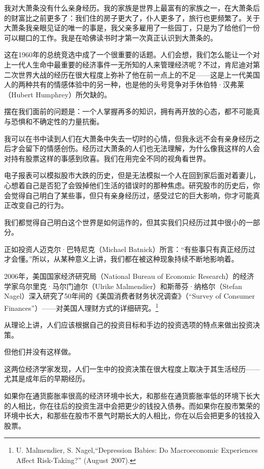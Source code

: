 {\kaishu

我对大萧条没有什么亲身经历。我的家族是世界上最富有的家族之一，在大萧条后的财富比之前更多了：我们住的房子更大了，仆人更多了，旅行也更频繁了。关于大萧条我亲眼见证的唯一的事是，我父亲多雇用了一些园丁，只是为了给他们一份可以糊口的工作。我是在哈佛读书时才第一次真正认识到大萧条的。

}

这在1960年的总统竞选中成了一个很重要的话题。人们会想，我们怎么能让一个对上一代人生命中最重要的经济事件一无所知的人来管理经济呢？不过，肯尼迪对第二次世界大战的经历在很大程度上弥补了他在前一点上的不足——这是上一代美国人的两种共有的情感体验中的另一种，也是他的头号竞争对手休伯特·汉弗莱（Hubert Humphrey）所欠缺的。

摆在我们面前的问题是：一个人掌握再多的知识，拥有再开放的心态，都不可能真与恐惧和不确定性的力量抗衡。

我可以在书中读到人们在大萧条中失去一切时的心情，但我永远不会有亲身经历之后才会留下的情感创伤。经历过大萧条的人们也无法理解，为什么像我这样的人会对持有股票这样的事感到欣喜。我们在用完全不同的视角看世界。

电子报表可以模拟股市大跌的历史，但是无法模拟一个人在回到家后面对着妻儿，心想着自己是否犯了会毁掉他们生活的错误时的那种焦虑。研究股市的历史后，你会觉得自己明白了某些事，但只有亲身经历过，感受过它的巨大影响，你才可能真正改变自己的行为。

我们都觉得自己明白这个世界是如何运作的，但其实我们只经历过其中很小的一部分。

正如投资人迈克尔·巴特尼克（Michael Batnick）所言：“有些事只有真正经历过才会懂。”所以，从某种意义上讲，我们都在被这种现象持续不断地影响着。

2006年，美国国家经济研究局（National Bureau of Economic Research）的经济学家乌尔里克·马尔门迪尔（Ulrike Malmendier）和斯蒂芬·纳格尔（Stefan Nagel）深入研究了50年间的《美国消费者财务状况调查》（“Survey of Consumer Finances”）——对美国人理财方式的详细研究。\footnote{U. Malmendier, S. Nagel,“Depression Babies: Do Macroeconomic Experiences Affect Risk-Taking?” (August 2007).}

从理论上讲，人们应该根据自己的投资目标和手边的投资选项的特点来做出投资决策。

但他们并没有这样做。

这两位经济学家发现，人们一生中的投资决策在很大程度上取决于其生活经历——尤其是成年后的早期经历。

如果你在通货膨胀率很高的经济环境中长大，和那些在通货膨胀率低的环境下长大的人相比，你在往后的投资生涯中会把更少的钱投入债券。而如果你在股市繁荣的环境中长大，和那些在股市不景气时期长大的人相比，你在以后会把更多的钱投入股票。

